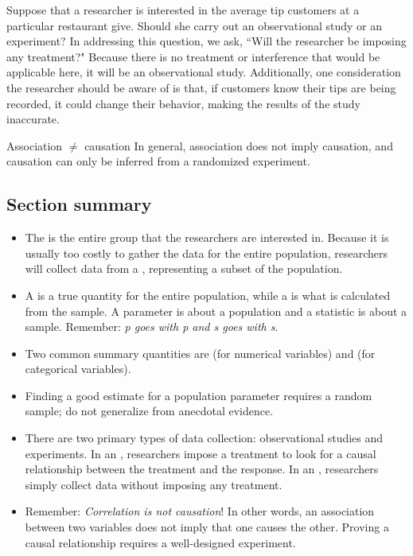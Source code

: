\begin{examplewrap}
\begin{nexample}{Suppose that a researcher is interested in the average tip customers at a particular restaurant give. Should she carry out an observational study or an experiment?}
In addressing this question, we ask, ``Will the researcher be imposing any treatment?"  Because there is no treatment or interference that would be applicable here, it will be an observational study. Additionally, one consideration the researcher should be aware of is that, if customers know their tips are being recorded, it could change their behavior, making the results of the study inaccurate.
\end{nexample}
\end{examplewrap}

\begin{onebox}{Association $\neq$ causation}
In general, association does not imply causation, and causation can only be inferred from a randomized experiment.
\end{onebox}



\subsection*{Section summary}
\begin{itemize}
\setlength{\itemsep}{0.5mm}
\item The  is the entire group that the researchers are interested in.  Because it is usually too costly to gather the data for the entire population, researchers will collect data from a , representing a subset of the population.

\item A  is a true quantity for the entire population, while a  is what is calculated from the sample.  A parameter is about a population and a statistic is about a sample.  Remember: \textit{p goes with p and s goes with s}.  

\item Two common summary quantities are  (for numerical variables) and  (for categorical variables).  

\item Finding a good estimate for a population parameter requires a random sample; do not generalize from anecdotal evidence.  

\item There are two primary types of data collection:  observational studies and experiments.  In an , researchers impose a treatment to look for a causal relationship between the treatment and the response.  In an , researchers simply collect data without imposing any treatment.

\item Remember:  \textit{Correlation is not causation}!  In other words, an association between two variables does not imply that one causes the other.  Proving a causal relationship requires a well-designed experiment.
  
\end{itemize}

